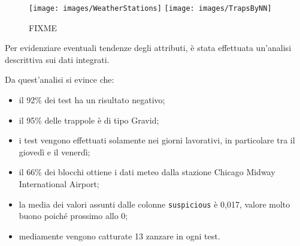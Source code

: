 \begin{figure}[htb]
	\centering
	\texttt{[image: images/WeatherStations]}
	\texttt{[image: images/TrapsByNN]}
	\caption{FIXME }
	\label{fig:weather-stations}
\end{figure}


Per evidenziare eventuali tendenze degli attributi, è stata effettuata 
un'analisi descrittiva sui dati integrati.


Da quest'analisi si evince che:
\begin{itemize}
	\item il 92\% dei test ha un risultato negativo;
	\item il 95\% delle trappole è di tipo Gravid;
	\item i test vengono effettuati solamente nei giorni lavorativi, in 
	particolare tra il giovedì e il venerdì;
	\item il 66\% dei blocchi ottiene i dati meteo dalla stazione Chicago 
	Midway International Airport;
	\item la media dei valori assunti dalle colonne \texttt{suspicious} è 
	0,017, valore molto buono poiché prossimo allo 0;
	\item mediamente vengono catturate 13 zanzare in ogni test.
\end{itemize} 
